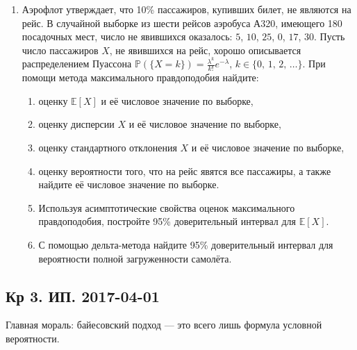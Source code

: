 \documentclass[12pt, a4paper]{article}\usepackage[]{graphicx}\usepackage[]{color}
\begin{document}
\begin{enumerate}
			\item
			Аэрофлот утверждает, что 10\% пассажиров, купивших билет, не являются на рейс. В случайной выборке из шести рейсов аэробуса А320, имеющего 180 посадочных мест, число не явившихся оказалось: $5$, $10$, $25$, $0$, $17$, $30$. Пусть число пассажиров $X$, не явившихся на рейс, хорошо описывается распределением Пуассона $\mathbb{P}(\{X = k\}) = \tfrac{\lambda^{k}}{k!}e^{-\lambda}$, $k \in \{0,\, 1,\, 2,\, \ldots\}$. При помощи метода максимального правдоподобия найдите:
			\begin{enumerate}
				\item оценку $\mathbb{E}[X]$ и её числовое значение по выборке,
				\item оценку дисперсии $X$ и её числовое значение по выборке,
				\item оценку стандартного отклонения $X$ и её числовое значение по выборке,
				\item оценку вероятности того, что на рейс явятся все пассажиры, а также найдите её числовое значение по выборке.
				\item Используя асимптотические свойства оценок максимального правдоподобия, постройте 95\% доверительный интервал для $\mathbb{E}[X]$.
				\item С помощью дельта-метода найдите 95\% доверительный интервал для вероятности полной загруженности самолёта.
			\end{enumerate}

		\end{enumerate}


		\subsection{Кр 3. ИП. 2017-04-01}

		Главная мораль: байесовский подход — это всего лишь формула условной вероятности.
\end{document}
